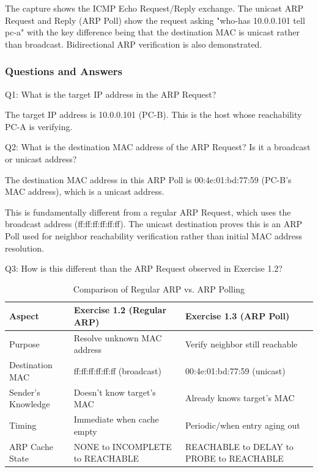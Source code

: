 \documentclass[11pt]{article}
\begin{document}
The capture shows the ICMP Echo Request/Reply exchange. The unicast ARP Request and Reply (ARP Poll) show the request asking "who-has 10.0.0.101 tell pc-a" with the key difference being that the destination MAC is unicast rather than broadcast. Bidirectional ARP verification is also demonstrated.

\subsubsection*{Questions and Answers}

Q1: What is the target IP address in the ARP Request?

The target IP address is 10.0.0.101 (PC-B). This is the host whose reachability PC-A is verifying.

\vspace{0.5cm}
Q2: What is the destination MAC address of the ARP Request? Is it a broadcast or unicast address?

The destination MAC address in this ARP Poll is 00:4e:01:bd:77:59 (PC-B's MAC address), which is a unicast address.

This is fundamentally different from a regular ARP Request, which uses the broadcast address (ff:ff:ff:ff:ff:ff). The unicast destination proves this is an ARP Poll used for neighbor reachability verification rather than initial MAC address resolution.

\vspace{0.5cm}
Q3: How is this different than the ARP Request observed in Exercise 1.2?

\begin{table}[H]
\centering
\begin{tabular}{|p{3cm}|p{5cm}|p{5cm}|}
\hline
Aspect & Exercise 1.2 (Regular ARP) & Exercise 1.3 (ARP Poll) \\
\hline
Purpose & Resolve unknown MAC address & Verify neighbor still reachable \\
\hline
Destination MAC & ff:ff:ff:ff:ff:ff (broadcast) & 00:4e:01:bd:77:59 (unicast) \\
\hline
Sender's Knowledge & Doesn't know target's MAC & Already knows target's MAC \\
\hline
Timing & Immediate when cache empty & Periodic/when entry aging out \\
\hline
ARP Cache State & NONE to INCOMPLETE to REACHABLE & REACHABLE to DELAY to PROBE to REACHABLE \\
\hline
\end{tabular}
\caption{Comparison of Regular ARP vs. ARP Polling}
\end{table}
\end{document}
